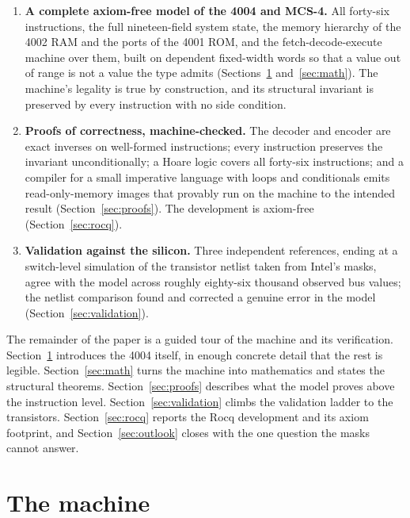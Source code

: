 \documentclass[11pt]{amsart}
\theoremstyle{plain}
\theoremstyle{definition}
\begin{document}
\begin{enumerate}
\item \textbf{A complete axiom-free model of the 4004 and MCS-4.} All forty-six instructions, the full nineteen-field system state, the memory hierarchy of the 4002 RAM and the ports of the 4001 ROM, and the fetch-decode-execute machine over them, built on dependent fixed-width words so that a value out of range is not a value the type admits (Sections~\ref{sec:machine} and~\ref{sec:math}). The machine's legality is true by construction, and its structural invariant is preserved by every instruction with no side condition.

\item \textbf{Proofs of correctness, machine-checked.} The decoder and encoder are exact inverses on well-formed instructions; every instruction preserves the invariant unconditionally; a Hoare logic covers all forty-six instructions; and a compiler for a small imperative language with loops and conditionals emits read-only-memory images that provably run on the machine to the intended result (Section~\ref{sec:proofs}). The development is axiom-free (Section~\ref{sec:rocq}).

\item \textbf{Validation against the silicon.} Three independent references, ending at a switch-level simulation of the transistor netlist taken from Intel's masks, agree with the model across roughly eighty-six thousand observed bus values; the netlist comparison found and corrected a genuine error in the model (Section~\ref{sec:validation}).
\end{enumerate}

The remainder of the paper is a guided tour of the machine and its verification. Section~\ref{sec:machine} introduces the 4004 itself, in enough concrete detail that the rest is legible. Section~\ref{sec:math} turns the machine into mathematics and states the structural theorems. Section~\ref{sec:proofs} describes what the model proves above the instruction level. Section~\ref{sec:validation} climbs the validation ladder to the transistors. Section~\ref{sec:rocq} reports the Rocq development and its axiom footprint, and Section~\ref{sec:outlook} closes with the one question the masks cannot answer.

\section{The machine}\label{sec:machine}
\end{document}
